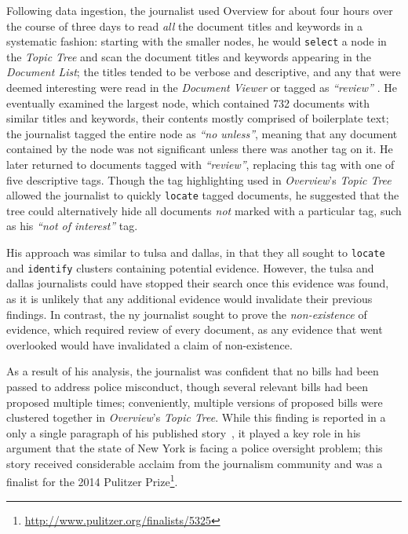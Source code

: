 Following data ingestion, the journalist used Overview for about four hours over the course of three days to read {\it all} the document titles and keywords in a systematic fashion: starting with the smaller nodes, he would {\tt select} a node in the {\it Topic Tree} and scan the document titles and keywords appearing in the {\it Document List}; the titles tended to be verbose and descriptive, and any that were deemed interesting were read in the {\it Document Viewer} or tagged as {\it ``review'' }. 
He eventually examined the largest node, which contained 732 documents with similar titles and keywords, their contents mostly comprised of boilerplate text; the journalist tagged the entire node as {\it ``no unless''}, meaning that any document contained by the node was not significant unless there was another tag on it. 
He later returned to documents tagged with {\it ``review''}, replacing this tag with one of five descriptive tags.
Though the tag highlighting used in {\it Overview}'s {\it Topic Tree} allowed the journalist to quickly {\tt locate} tagged documents, he suggested that the tree could alternatively hide all documents {\it not} marked with a particular tag, such as his {\it ``not of interest''} tag.

His approach was similar to {\sc tulsa} and {\sc dallas}, in that they all sought to {\tt locate} and {\tt identify} clusters containing potential evidence.
However, the {\sc tulsa} and {\sc dallas} journalists could have stopped their search once this evidence was found, as it is unlikely that any additional evidence would invalidate their previous findings.
In contrast, the {\sc ny} journalist sought to prove the {\it non-existence} of evidence, which required review of every document, as any evidence that went overlooked would have invalidated a claim of non-existence.

As a result of his analysis, the journalist was confident that no bills had been passed to address police misconduct, though several relevant bills had been proposed multiple times; conveniently, multiple versions of proposed bills were clustered together in {\it Overview}'s {\it Topic Tree}.
While this finding is reported in a only a single paragraph of his published story~\cite{Playford2013}, it played a key role in his argument that the state of New York is facing a police oversight problem; this story received considerable acclaim from the journalism community and was a finalist for the 2014 Pulitzer Prize\footnote{\url{http://www.pulitzer.org/finalists/5325}}.

